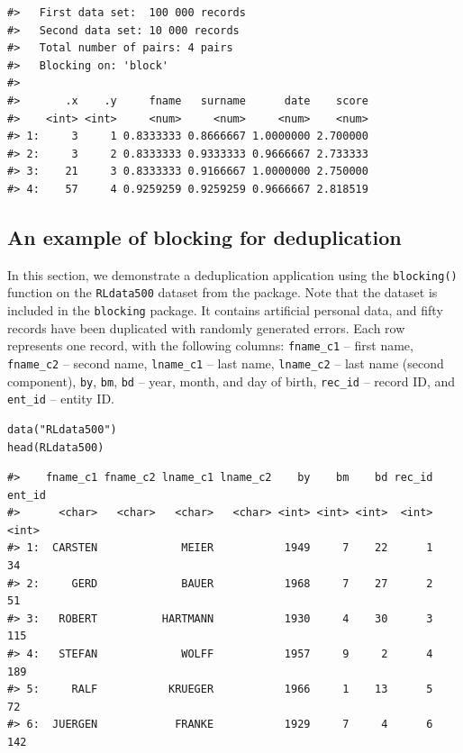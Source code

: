 \begin{verbatim}
#>   First data set:  100 000 records
#>   Second data set: 10 000 records
#>   Total number of pairs: 4 pairs
#>   Blocking on: 'block'
#> 
#>       .x    .y     fname   surname      date    score
#>    <int> <int>     <num>     <num>     <num>    <num>
#> 1:     3     1 0.8333333 0.8666667 1.0000000 2.700000
#> 2:     3     2 0.8333333 0.9333333 0.9666667 2.733333
#> 3:    21     3 0.8333333 0.9166667 1.0000000 2.750000
#> 4:    57     4 0.9259259 0.9259259 0.9666667 2.818519
\end{verbatim}

\subsection{An example of blocking for deduplication}\label{an-example-of-blocking-for-deduplication}

In this section, we demonstrate a deduplication application using the
\texttt{blocking()} function on the \texttt{RLdata500} dataset from the
 package. Note that the dataset is included in
the \texttt{blocking} package. It contains artificial personal data, and fifty
records have been duplicated with randomly generated errors. Each row
represents one record, with the following columns: \texttt{fname\_c1} -- first
name, \texttt{fname\_c2} -- second name, \texttt{lname\_c1} -- last name, \texttt{lname\_c2} --
last name (second component), \texttt{by}, \texttt{bm}, \texttt{bd} -- year, month, and day of
birth, \texttt{rec\_id} -- record ID, and \texttt{ent\_id} -- entity ID.

\begin{verbatim}
data("RLdata500")
head(RLdata500)
\end{verbatim}

\begin{verbatim}
#>    fname_c1 fname_c2 lname_c1 lname_c2    by    bm    bd rec_id ent_id
#>      <char>   <char>   <char>   <char> <int> <int> <int>  <int>  <int>
#> 1:  CARSTEN             MEIER           1949     7    22      1     34
#> 2:     GERD             BAUER           1968     7    27      2     51
#> 3:   ROBERT          HARTMANN           1930     4    30      3    115
#> 4:   STEFAN             WOLFF           1957     9     2      4    189
#> 5:     RALF           KRUEGER           1966     1    13      5     72
#> 6:  JUERGEN            FRANKE           1929     7     4      6    142
\end{verbatim}

